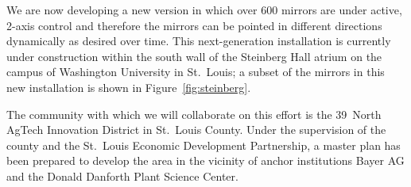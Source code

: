 We are now developing a
new version in which over 600 mirrors are under 
active, 2-axis control and therefore the mirrors
can be pointed in different directions dynamically as desired over time. 
This next-generation installation is currently under construction within 
the south wall of the Steinberg Hall atrium on the campus of 
Washington University in St.~Louis; a subset of the mirrors in this new
installation is shown in Figure~\ref{fig:steinberg}.

The community with which we will collaborate on this effort is
the 39~North AgTech Innovation District in St.~Louis County. Under the
supervision of the county and the St.~Louis Economic Development Partnership, 
a master plan has been prepared to develop the area in the vicinity of  
anchor institutions Bayer AG and the Donald Danforth Plant Science Center. 
